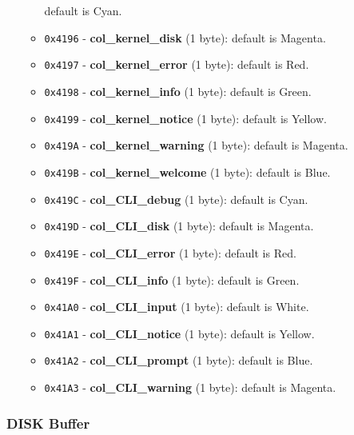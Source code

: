 \begin{itemize}
\begin{itemize}
                    default is Cyan.
                \item \texttt{0x4196} - \textbf{col\_kernel\_disk} (1 byte):
                    default is Magenta.
                \item \texttt{0x4197} - \textbf{col\_kernel\_error} (1 byte):
                    default is Red.
                \item \texttt{0x4198} - \textbf{col\_kernel\_info} (1 byte):
                    default is Green.
                \item \texttt{0x4199} - \textbf{col\_kernel\_notice} (1 byte):
                    default is Yellow.
                \item \texttt{0x419A} - \textbf{col\_kernel\_warning} (1 byte):
                    default is Magenta.
                \item \texttt{0x419B} - \textbf{col\_kernel\_welcome} (1 byte):
                    default is Blue.
                \item \texttt{0x419C} - \textbf{col\_CLI\_debug} (1 byte):
                    default is Cyan.
                \item \texttt{0x419D} - \textbf{col\_CLI\_disk} (1 byte):
                    default is Magenta.
                \item \texttt{0x419E} - \textbf{col\_CLI\_error} (1 byte):
                    default is Red.
                \item \texttt{0x419F} - \textbf{col\_CLI\_info} (1 byte):
                    default is Green.
                \item \texttt{0x41A0} - \textbf{col\_CLI\_input} (1 byte):
                    default is White.
                \item \texttt{0x41A1} - \textbf{col\_CLI\_notice} (1 byte):
                    default is Yellow.
                \item \texttt{0x41A2} - \textbf{col\_CLI\_prompt} (1 byte):
                    default is Blue.
                \item \texttt{0x41A3} - \textbf{col\_CLI\_warning} (1 byte):
                    default is Magenta.
            \end{itemize}
        \end{itemize}

        \subsubsection{DISK Buffer}

